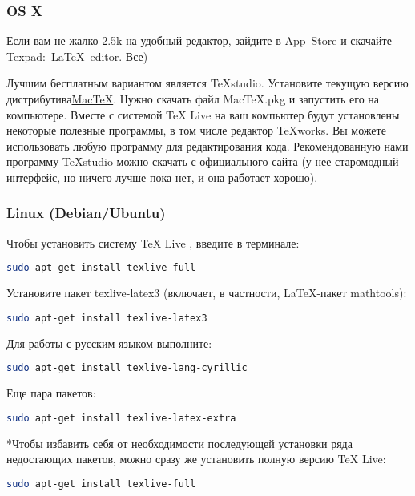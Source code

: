 \subsubsection{OS X}
Если вам не жалко 2.5k на удобный редактор, зайдите в App~Store и скачайте Texpad:~LaTeX~editor. Все)

Лучшим бесплатным вариантом является TeXstudio.
Установите текущую версию дистрибутива\href{https://tug.org/mactex/}{MacTeX}. 
Нужно скачать файл MacTeX.pkg и запустить его на компьютере. 
Вместе с системой TeX Live на ваш компьютер будут установлены некоторые полезные программы, в том числе редактор TeXworks. 
Вы можете использовать любую программу для редактирования кода. 
Рекомендованную нами программу \href{https://www.texstudio.org}{TeXstudio} можно скачать с официального сайта (у нее старомодный интерфейс, но ничего лучше пока нет, и она работает хорошо).

\subsubsection{Linux (Debian/Ubuntu)}

Чтобы установить систему TeX Live , введите в терминале:
\begin{lstlisting}[backgroundcolor = \color{light-gray}, language=bash]
sudo apt-get install texlive-full
\end{lstlisting}

Установите пакет texlive-latex3 (включает, в частности, LaTeX-пакет mathtools):
\begin{lstlisting}[backgroundcolor = \color{light-gray}, language=bash]
sudo apt-get install texlive-latex3
\end{lstlisting}


Для работы с русским языком выполните:
\begin{lstlisting}[backgroundcolor = \color{light-gray}, language=bash]
sudo apt-get install texlive-lang-cyrillic
\end{lstlisting} 


Еще пара пакетов:
\begin{lstlisting}[backgroundcolor = \color{light-gray}, language=bash]
sudo apt-get install texlive-latex-extra
\end{lstlisting}

*Чтобы избавить себя от необходимости последующей установки ряда недостающих пакетов, можно сразу же установить полную версию TeX Live:
\begin{lstlisting}[backgroundcolor = \color{light-gray}, language=bash]
sudo apt-get install texlive-full
\end{lstlisting}

